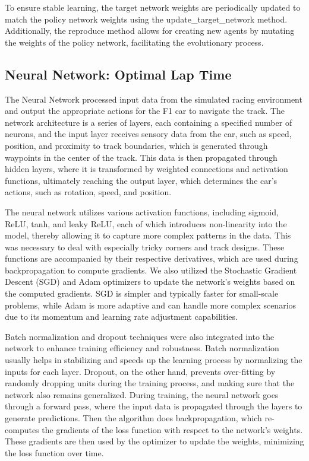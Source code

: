 \documentclass[12pt]{article}
\begin{document}
To ensure stable learning, the target network weights are periodically updated 
to match the policy network weights using the update\_target\_network method. 
Additionally, the reproduce method allows for creating new agents by mutating 
the weights of the policy network, facilitating the evolutionary process.

\subsection{Neural Network: Optimal Lap Time}

The Neural Network processed input data from the simulated racing environment 
and output the appropriate actions for the F1 car to navigate the track. The 
network architecture is a series of layers, each containing a specified number 
of neurons, and the input layer receives sensory data from the car, such as 
speed, position, and proximity to track boundaries, which is generated through 
waypoints in the center of the track. This data is then propagated through 
hidden layers, where it is transformed by weighted connections and activation 
functions, ultimately reaching the output layer, which determines the car's 
actions, such as rotation, speed, and position.

The neural network utilizes various activation functions, including sigmoid, 
ReLU, tanh, and leaky ReLU, each of which introduces non-linearity into the 
model, thereby allowing it to capture more complex patterns in the data. This 
was necessary to deal with especially tricky corners and track designs. These 
functions are accompanied by their respective derivatives, which are used 
during backpropagation to compute gradients. We also utilized the Stochastic 
Gradient Descent (SGD) and Adam optimizers to update the network's weights 
based on the computed gradients. SGD is simpler and typically faster for 
small-scale problems, while Adam is more adaptive and can handle more complex 
scenarios due to its momentum and learning rate adjustment capabilities.

Batch normalization and dropout techniques were also integrated into the 
network to enhance training efficiency and robustness. Batch normalization 
usually helps in stabilizing and speeds up the learning process by normalizing 
the inputs for each layer. Dropout, on the other hand, prevents over-fitting by 
randomly dropping units during the training process, and making sure that the 
network also remains generalized. During training, the neural network goes 
through a forward pass, where the input data is propagated through the layers 
to generate predictions. Then the algorithm does backpropagation, which 
re-computes the gradients of the loss function with respect to the network's 
weights. These gradients are then used by the optimizer to update the weights, 
minimizing the loss function over time.
\end{document}
